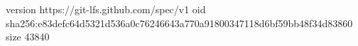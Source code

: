 version https://git-lfs.github.com/spec/v1
oid sha256:e83defc64d5321d536a0c76246643a770a91800347118d6bf59bb48f34d83860
size 43840
